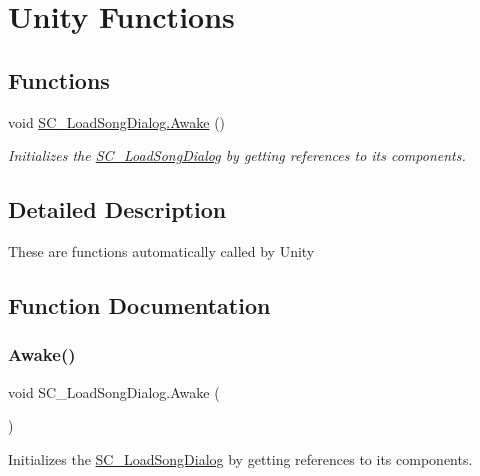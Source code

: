 \hypertarget{group___s_c___l_s_d_unity}{}\section{Unity Functions}
\label{group___s_c___l_s_d_unity}
\subsection*{Functions}
\begin{DoxyCompactItemize}
\item 
void \hyperlink{group___s_c___l_s_d_unity_ga2fe8760877d7edd380795cac5749be50}{S\+C\+\_\+\+Load\+Song\+Dialog.\+Awake} ()
\begin{DoxyCompactList}\small\item\em Initializes the \hyperlink{class_s_c___load_song_dialog}{S\+C\+\_\+\+Load\+Song\+Dialog} by getting references to its components. \end{DoxyCompactList}\end{DoxyCompactItemize}


\subsection{Detailed Description}
These are functions automatically called by Unity 

\subsection{Function Documentation}
\mbox{\label{group___s_c___l_s_d_unity_ga2fe8760877d7edd380795cac5749be50}} 
\subsubsection{\texorpdfstring{Awake()}{Awake()}}
{\footnotesize\ttfamily void S\+C\+\_\+\+Load\+Song\+Dialog.\+Awake (\begin{DoxyParamCaption}{ }\end{DoxyParamCaption})\hspace{0.3cm}{\ttfamily [private]}}



Initializes the \hyperlink{class_s_c___load_song_dialog}{S\+C\+\_\+\+Load\+Song\+Dialog} by getting references to its components. 



